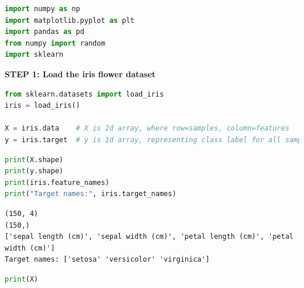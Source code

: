 \documentclass[
]{article}
\author{}
\date{}
\begin{document}
\begin{lstlisting}[language=Python]
import numpy as np
import matplotlib.pyplot as plt
import pandas as pd
from numpy import random
import sklearn
\end{lstlisting}

\textbf{STEP 1: Load the iris flower dataset}

\begin{lstlisting}[language=Python]
from sklearn.datasets import load_iris
iris = load_iris()

X = iris.data    # X is 2d array, where row=samples, column=features
y = iris.target  # y is 1d array, representing class label for all samples
\end{lstlisting}

\begin{lstlisting}[language=Python]
print(X.shape)
print(y.shape)
print(iris.feature_names)
print("Target names:", iris.target_names)
\end{lstlisting}

\begin{lstlisting}
(150, 4)
(150,)
['sepal length (cm)', 'sepal width (cm)', 'petal length (cm)', 'petal width (cm)']
Target names: ['setosa' 'versicolor' 'virginica']
\end{lstlisting}

\begin{lstlisting}[language=Python]
print(X)
\end{lstlisting}
\end{document}
